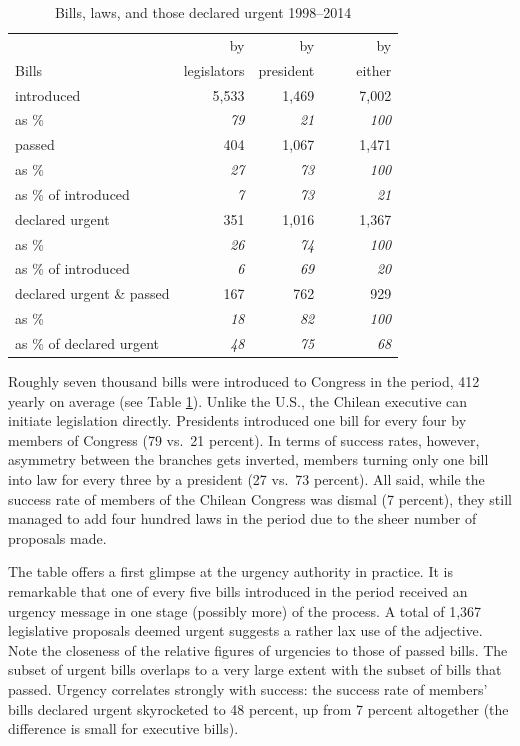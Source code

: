 \documentclass[letter,12pt]{article}
\begin{document}
\begin{table}
\centering
\begin{tabular}{lrrr}
                         &  by           &  by          &    by      \\
Bills                    &  legislators  &  president   &    ~~~~either  \\ \hline
introduced               &        5,533  &       1,469  &     7,002  \\
as \%                    &    \emph{79}  &   \emph{21}  & \emph{100} \\ \hdashline
passed                   &          404  &       1,067  &     1,471  \\
as \%                    &    \emph{27}  &   \emph{73}  & \emph{100} \\
as \% of introduced      &     \emph{7}  &   \emph{73}  &  \emph{21} \\ \hdashline
declared urgent          &          351  &       1,016  &     1,367  \\
as \%                    &    \emph{26}  &   \emph{74}  & \emph{100} \\
as \% of introduced      &     \emph{6}  &   \emph{69}  &  \emph{20} \\ \hdashline
declared urgent \& passed&          167  &         762  &       929  \\
as \%                    &    \emph{18}  &   \emph{82}  & \emph{100} \\
as \% of declared urgent &    \emph{48}  &   \emph{75}  &  \emph{68} \\ \hline
\end{tabular}
\caption{Bills, laws, and those declared urgent 1998--2014}\label{T:billDescriptives}
\end{table}

Roughly seven thousand bills were introduced to Congress in the period, 412 yearly on average (see Table \ref{T:billDescriptives}). Unlike the U.S., the Chilean executive can initiate legislation directly. Presidents introduced one bill for every four by members of Congress (79 vs.\ 21 percent). In terms of success rates, however, asymmetry between the branches gets inverted, members turning only one bill into law for every three by a president (27 vs.\ 73 percent). All said, while the success rate of members of the Chilean Congress was dismal (7 percent), they still managed to add four hundred laws in the period due to the sheer number of proposals made. 

The table offers a first glimpse at the urgency authority in practice. It is remarkable that one of every five bills introduced in the period received an urgency message in one stage (possibly more) of the process. A total of 1,367 legislative proposals deemed urgent suggests a rather lax use of the adjective. Note the closeness of the relative figures of urgencies to those of passed bills. The subset of urgent bills overlaps to a very large extent with the subset of bills that passed. Urgency correlates strongly with success: the success rate of members' bills declared urgent skyrocketed to 48 percent, up from 7 percent altogether (the difference is small for executive bills). 
\end{document}
